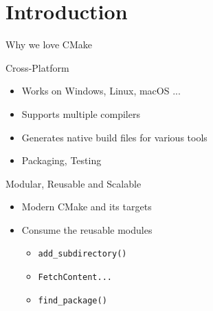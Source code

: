 \documentclass{beamer}
\begin{document}
\section{Introduction}%
\begin{frame}[fragile]{Why we love CMake}%
	\vspace{1cm}
	\begin{block}{Cross-Platform}%
		\begin{itemize}%
			\item Works on Windows, Linux, macOS ...%
			\item Supports multiple compilers%
			\item Generates native build files for various tools
			\item Packaging, Testing%
		\end{itemize}%
	\end{block}%
	\begin{block}{Modular, Reusable and Scalable}%
		\begin{itemize}%
			\item Modern CMake and its targets%
			\item Consume the reusable modules%
			\begin{itemize}
				\item \texttt{add\_subdirectory()}
				\item \texttt{FetchContent...}
				\item \texttt{find\_package()}
			\end{itemize}%

\end{itemize}
\end{block}
\end{frame}
\end{document}
